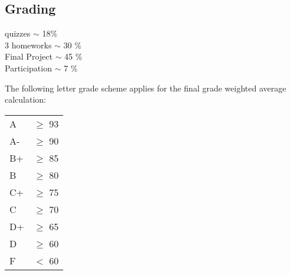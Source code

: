 \documentclass[10pt]{article}
\begin{document}
\subsection*{Grading}

 quizzes $\sim$ 18\%\\
3 homeworks $\sim$ 30 \%\\
Final Project $\sim$ 45 \%\\
Participation $\sim$ 7 \%

\vspace{1em}
\noindent
The following letter grade scheme applies for the final grade weighted average calculation:

\vspace{1em}
\noindent
\begin{tabular}{ll}
A & $\geq$ 93\\
A- & $\geq$ 90\\
B+ & $\geq$ 85\\
B & $\geq$ 80\\
C+ & $\geq$ 75\\
C & $\geq$ 70\\
D+ & $\geq$ 65\\
D & $\geq$ 60\\
F & $<$ 60
\end{tabular}
\end{document}
